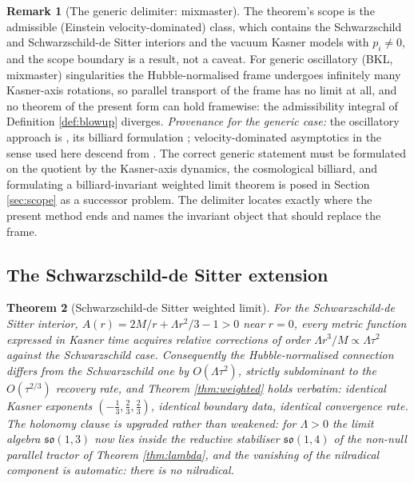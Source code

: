 \documentclass[11pt]{article}
\newtheorem{theorem}{Theorem}[section]
\theoremstyle{definition}
\newtheorem{remark}[theorem]{Remark}
\begin{document}
\begin{remark}[The generic delimiter: mixmaster]\label{rem:delimiter}
The theorem's scope is the admissible (Einstein velocity-dominated) class, which contains the Schwarzschild and Schwarzschild-de Sitter interiors and the vacuum Kasner models with $p_i \neq 0$, and the scope boundary is a result, not a caveat. For generic oscillatory (BKL, mixmaster) singularities the Hubble-normalised frame undergoes infinitely many Kasner-axis rotations, so parallel transport of the frame has no limit at all, and no theorem of the present form can hold framewise: the admissibility integral of Definition \ref{def:blowup} diverges. \emph{Provenance for the generic case:} the oscillatory approach is \cite{BKL1970}, its billiard formulation \cite{DHN2003}; velocity-dominated asymptotics in the sense used here descend from \cite{ELS1972, IsenbergMoncrief1990}. The correct generic statement must be formulated on the quotient by the Kasner-axis dynamics, the cosmological billiard, and formulating a billiard-invariant weighted limit theorem is posed in Section \ref{sec:scope} as a successor problem. The delimiter locates exactly where the present method ends and names the invariant object that should replace the frame.
\end{remark}

\subsection{The Schwarzschild-de Sitter extension}\label{subsec:sds}

\begin{theorem}[Schwarzschild-de Sitter weighted limit]\label{thm:sds}
For the Schwarzschild-de Sitter interior, $A(r) = 2M/r + \Lambda r^2/3 - 1 > 0$ near $r = 0$, every metric function expressed in Kasner time acquires relative corrections of order $\Lambda r^3/M \propto \Lambda\tau^2$ against the Schwarzschild case. Consequently the Hubble-normalised connection differs from the Schwarzschild one by $O(\Lambda\tau^2)$, strictly subdominant to the $O(\tau^{2/3})$ recovery rate, and Theorem \ref{thm:weighted} holds verbatim: identical Kasner exponents $(-\tfrac13, \tfrac23, \tfrac23)$, identical boundary data, identical convergence rate. The holonomy clause is upgraded rather than weakened: for $\Lambda > 0$ the limit algebra $\mathfrak{so}(1,3)$ now lies inside the \emph{reductive} stabiliser $\mathfrak{so}(1,4)$ of the non-null parallel tractor of Theorem \ref{thm:lambda}, and the vanishing of the nilradical component is automatic: there is no nilradical.
\end{theorem}
\end{document}
